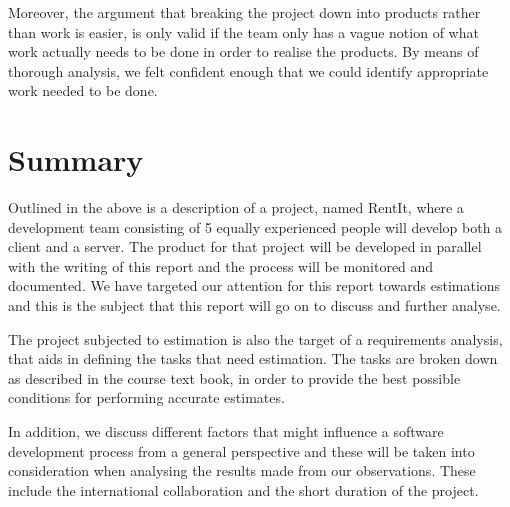 Moreover, the argument that breaking the project down into products rather than work is easier, is only valid if the team only has a vague notion of what work actually needs to be done in order to realise the products. By means of thorough analysis, we felt confident enough that we could identify appropriate work needed to be done.


\section{Summary}
Outlined in the above is a description of a project, named RentIt, where a development team consisting of 5 equally experienced people will develop both a client and a server. The product for that project will be developed in parallel with the writing of this report and the process will be monitored and documented. We have targeted our attention for this report towards estimations and this is the subject that this report will go on to discuss and further analyse.

The project subjected to estimation is also the target of a requirements analysis, that aids in defining the tasks that need estimation. The tasks are broken down as described in the course text book, in order to provide the best possible conditions for performing accurate estimates.

In addition, we discuss different factors that might influence a software development process from a general perspective and these will be taken into consideration when analysing the results made from our observations. These include the international collaboration and the short duration of the project. \\


 



